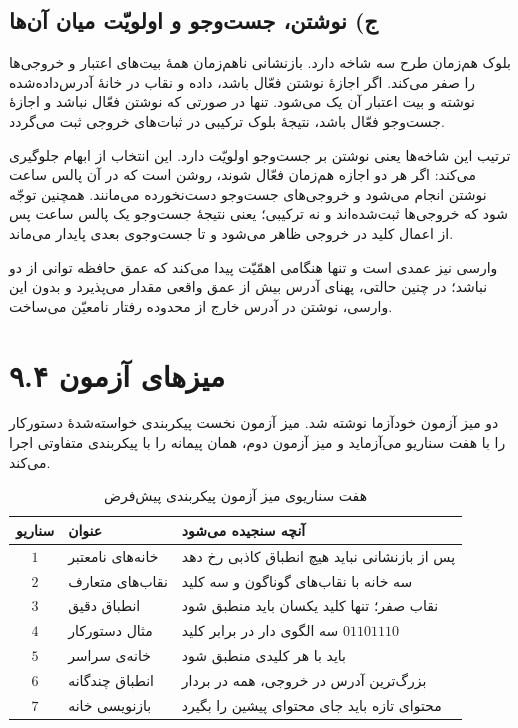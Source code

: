 \documentclass[12pt,a4paper]{article}
\begin{document}
	\subsection*{ج) نوشتن، جست‌وجو و اولویّت میان آن‌ها}
	بلوک هم‌زمان طرح سه شاخه دارد. بازنشانی ناهم‌زمان همهٔ بیت‌های اعتبار و خروجی‌ها را صفر می‌کند. اگر اجازهٔ نوشتن فعّال باشد، داده و نقاب در خانهٔ آدرس‌داده‌شده نوشته و بیت اعتبار آن یک می‌شود. تنها در صورتی که نوشتن فعّال نباشد و اجازهٔ جست‌وجو فعّال باشد، نتیجهٔ بلوک ترکیبی در ثبات‌های خروجی ثبت می‌گردد.

	ترتیب این شاخه‌ها یعنی نوشتن بر جست‌وجو اولویّت دارد. این انتخاب از ابهام جلوگیری می‌کند: اگر هر دو اجازه هم‌زمان فعّال شوند، روشن است که در آن پالس ساعت نوشتن انجام می‌شود و خروجی‌های جست‌وجو دست‌نخورده می‌مانند. همچنین توجّه شود که خروجی‌ها ثبت‌شده‌اند و نه ترکیبی؛ یعنی نتیجهٔ جست‌وجو یک پالس ساعت پس از اعمال کلید در خروجی ظاهر می‌شود و تا جست‌وجوی بعدی پایدار می‌ماند.

	وارسی  نیز عمدی است و تنها هنگامی اهمّیّت پیدا می‌کند که عمق حافظه توانی از دو نباشد؛ در چنین حالتی، پهنای آدرس بیش از عمق واقعی مقدار می‌پذیرد و بدون این وارسی، نوشتن در آدرس خارج از محدوده رفتار نامعیّن می‌ساخت.


	\section*{۹.۴ میزهای آزمون}
	دو میز آزمون خودآزما نوشته شد. میز آزمون نخست پیکربندی خواسته‌شدهٔ دستورکار را با هفت سناریو می‌آزماید و میز آزمون دوم، همان پیمانه را با پیکربندی متفاوتی اجرا می‌کند.

	\begin{table}[H]
		\centering
		\footnotesize
		\begin{tabular}{|c|l|l|}
			\hline
			\textbf{سناریو} & \textbf{عنوان} & \textbf{آنچه سنجیده می‌شود} \\ \hline
			\(1\) & خانه‌های نامعتبر & پس از بازنشانی نباید هیچ انطباق کاذبی رخ دهد \\ \hline
			\(2\) & نقاب‌های متعارف & سه خانه با نقاب‌های گوناگون و سه کلید \\ \hline
			\(3\) & انطباق دقیق & نقاب صفر؛ تنها کلید یکسان باید منطبق شود \\ \hline
			\(4\) & مثال دستورکار & سه الگوی \lr{X}دار در برابر کلید \(01101110\) \\ \hline
			\(5\) & خانه‌ی سراسر \lr{X} & باید با هر کلیدی منطبق شود \\ \hline
			\(6\) & انطباق چندگانه & بزرگ‌ترین آدرس در خروجی، همه در بردار \\ \hline
			\(7\) & بازنویسی خانه & محتوای تازه باید جای محتوای پیشین را بگیرد \\ \hline
		\end{tabular}
		\caption{هفت سناریوی میز آزمون پیکربندی پیش‌فرض}
	\end{table}
\end{document}
